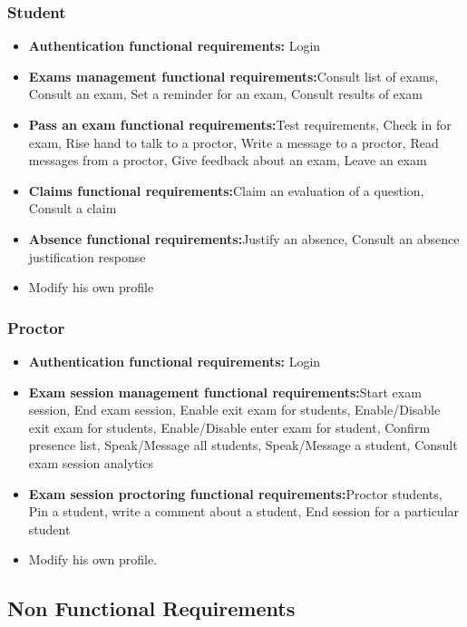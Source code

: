 \documentclass[]{uc2pfecaneva}
\begin{document}
    \subsubsection{Student}
    \begin{itemize}
        \item{\textbf{Authentication functional requirements:} Login}
        \item{\textbf{Exams management functional requirements:}Consult list of exams, Consult an exam, Set a reminder for an exam, Consult results of exam}
        \item{\textbf{Pass an exam functional requirements:}Test requirements, Check in for exam, Rise hand to talk to a proctor, Write a message to a proctor, Read messages from a proctor, Give feedback about an exam, Leave an exam}
        \item{\textbf{Claims functional requirements:}Claim an evaluation of a question, Consult a claim}
        \item{\textbf{Absence functional requirements:}Justify an absence, Consult an absence justification response}
        \item Modify his own profile
    \end{itemize}


    \subsubsection{Proctor}
    \begin{itemize}
        \item{\textbf{Authentication functional requirements:} Login}
        \item{\textbf{Exam session management functional requirements:}Start exam session, End exam session, Enable exit exam for students, Enable/Disable exit exam for students, Enable/Disable enter exam for student, Confirm presence list, Speak/Message all students, Speak/Message a student, Consult exam session analytics}
        \item{\textbf{Exam session proctoring functional requirements:}Proctor students, Pin a student, write a comment about a student, End session for a particular student}
        \item Modify his own profile.
    \end{itemize}


    \raggedright\subsection{Non Functional Requirements}
\end{document}
